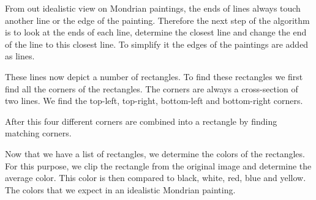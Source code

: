 From out idealistic view on Mondrian paintings, the ends of lines always touch
another line or the edge of the painting. Therefore the next step of the
algorithm is to look at the ends of each line, determine the closest line and
change the end of the line to this closest line. To simplify it the edges of the
paintings are added as lines.

These lines now depict a number of rectangles. To find these rectangles we first
find all the corners of the rectangles. The corners are always a cross-section
of two lines. We find the top-left, top-right, bottom-left and bottom-right
corners.

After this four different corners are combined into a rectangle by finding
matching corners.

Now that we have a list of rectangles, we determine the colors of the
rectangles. For this purpose, we clip the rectangle from the original image and
determine the average color. This color is then compared to black, white, red,
blue and yellow. The colors that we expect in an idealistic Mondrian painting.
